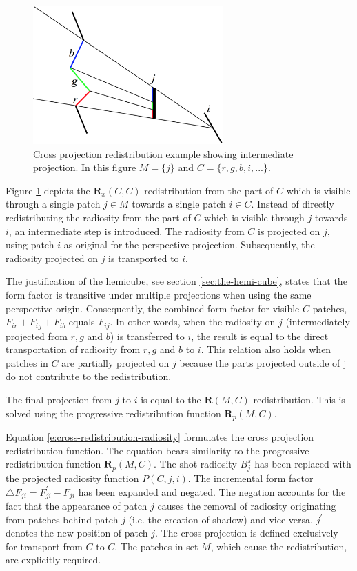 \begin{figure}
\sidecaption
	\includegraphics[width=0.65\textwidth]{graphics/gi/path-39}
	\caption{Cross projection redistribution example showing intermediate projection. In this figure $M = \{j\}$ and $C = \{r,g,b,i,...\}$.}
	\label{f:r-c-c}
\end{figure}

Figure \ref{f:r-c-c} depicts the $\mathbf{R}_x(C,C)$ redistribution from the part of $C$ which is visible through a single patch $j\in M$ towards a single patch $i\in C$. Instead of directly redistributing the radiosity from the part of $C$ which is visible through $j$ towards $i$, an intermediate step is introduced. The radiosity from $C$ is projected on $j$, using patch $i$ as original for the perspective projection. Subsequently, the radiosity projected on $j$ is transported to $i$. 

The justification of the hemicube, see section \ref{sec:the-hemi-cube}, states that the form factor is transitive under multiple projections when using the same perspective origin. Consequently, the combined form factor for visible $C$ patches, $F_{ir}+F_{ig}+F_{ib}$ equals $F_{ij}$. In other words, when the radiosity on $j$ (intermediately projected from $r,g$ and $b$) is transferred to $i$, the result is equal to the direct transportation of radiosity from $r,g$ and $b$ to $i$. This relation also holds when patches in $C$ are partially projected on $j$ because the parts projected outside of j do not contribute to the redistribution.

The final projection from $j$ to $i$ is equal to the $\mathbf{R}(M,C)$ redistribution. This is solved using the progressive redistribution function $\mathbf{R}_p(M, C)$.

Equation \ref{e:cross-redistribution-radiosity} formulates the cross projection redistribution function. The equation bears similarity to the progressive redistribution function $\mathbf{R}_p(M,C)$. The shot radiosity $B_j^{s}$ has been replaced with the projected radiosity function $P(C,j,i)$. The incremental form factor  $\triangle F_{ji}=F^{'}_{ji}-F_{ji}$ has been expanded and negated. The negation accounts for the fact that the appearance of patch $j$ causes the removal of radiosity originating from patches behind patch $j$ (i.e. the creation of shadow) and vice versa. $j^{'}$ denotes the new position of patch $j$. The cross projection is defined exclusively for transport from $C$ to $C$. The patches in set $M$, which cause the redistribution, are explicitly required.

